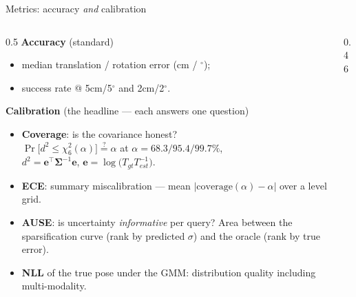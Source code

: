\documentclass[aspectratio=169,10pt]{beamer}
\begin{document}
\begin{frame}{Metrics: accuracy \emph{and} calibration}
  \small
  \begin{columns}[T]
    \begin{column}{0.5\textwidth}
      \textbf{Accuracy} (standard)
      \begin{itemize}
        \item median translation / rotation error (cm / $^\circ$);
        \item success rate @ 5cm/5$^\circ$ and 2cm/2$^\circ$.
      \end{itemize}
      \vspace{1mm}
      \textbf{Calibration} (the headline --- each answers one question)
      \begin{itemize}
        \item \textbf{Coverage}: is the covariance honest?\\
              $\Pr\!\big[d^2 \le \chi^2_{6}(\alpha)\big] \overset{?}{=} \alpha$
              at $\alpha = 68.3 / 95.4 / 99.7\%$,\\
              $d^2 = \mathbf{e}^\top \bm\Sigma^{-1} \mathbf{e}$,
              $\mathbf{e} = \log\!\big(T_{gt} T_{est}^{-1}\big)$.
        \item \textbf{ECE}: summary miscalibration ---
              mean $|\text{coverage}(\alpha) - \alpha|$ over a level grid.
        \item \textbf{AUSE}: is uncertainty \emph{informative} per query?
              Area between the sparsification curve (rank by predicted
              $\sigma$) and the oracle (rank by true error).
        \item \textbf{NLL} of the true pose under the GMM: distribution
              quality including multi-modality.
      \end{itemize}
    \end{column}
    \begin{column}{0.46\textwidth}
      \centering
\end{column}
\end{columns}
\end{frame}
\end{document}
